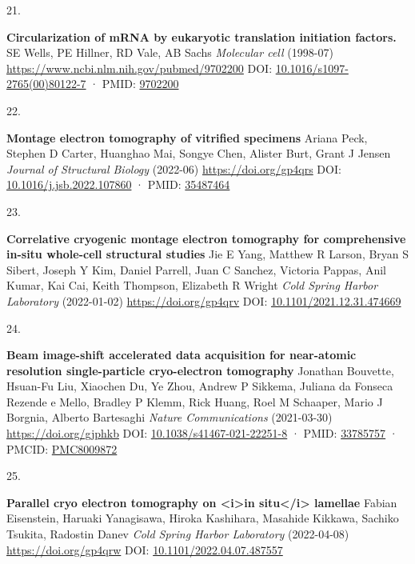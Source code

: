 \documentclass[
]{article}
\newlength{\cslhangindent}
\newlength{\csllabelwidth}
\newlength{\cslentryspacingunit} %
\newenvironment{CSLReferences}[2] %
 {%
  \setlength{\parindent}{0pt}
  \ifodd #1
  \let\oldpar\par
  \def\par{\hangindent=\cslhangindent\oldpar}
  \fi
  \setlength{\parskip}{#2\cslentryspacingunit}
 }%
 {}
\newcommand{\CSLBlock}[1]{#1\hfill\break}
\newcommand{\CSLLeftMargin}[1]{\parbox[t]{\csllabelwidth}{#1}}
\newcommand{\CSLRightInline}[1]{\parbox[t]{\linewidth - \csllabelwidth}{#1}\break}
\begin{document}
\begin{CSLReferences}{0}{0}
\leavevmode{}%
\CSLLeftMargin{21. }%
\CSLRightInline{\textbf{Circularization of mRNA by eukaryotic translation initiation factors.}
\CSLBlock{SE Wells, PE Hillner, RD Vale, AB Sachs} \emph{Molecular cell} (1998-07) \url{https://www.ncbi.nlm.nih.gov/pubmed/9702200}
\CSLBlock{DOI: \href{https://doi.org/10.1016/s1097-2765(00)80122-7}{10.1016/s1097-2765(00)80122-7} · PMID: \href{https://www.ncbi.nlm.nih.gov/pubmed/9702200}{9702200}}}

\leavevmode{}%
\CSLLeftMargin{22. }%
\CSLRightInline{\textbf{Montage electron tomography of vitrified specimens}
\CSLBlock{Ariana Peck, Stephen D Carter, Huanghao Mai, Songye Chen, Alister Burt, Grant J Jensen} \emph{Journal of Structural Biology} (2022-06) \url{https://doi.org/gp4qrs}
\CSLBlock{DOI: \href{https://doi.org/10.1016/j.jsb.2022.107860}{10.1016/j.jsb.2022.107860} · PMID: \href{https://www.ncbi.nlm.nih.gov/pubmed/35487464}{35487464}}}

\leavevmode{}%
\CSLLeftMargin{23. }%
\CSLRightInline{\textbf{Correlative cryogenic montage electron tomography for comprehensive in-situ whole-cell structural studies}
\CSLBlock{Jie E Yang, Matthew R Larson, Bryan S Sibert, Joseph Y Kim, Daniel Parrell, Juan C Sanchez, Victoria Pappas, Anil Kumar, Kai Cai, Keith Thompson, Elizabeth R Wright} \emph{Cold Spring Harbor Laboratory} (2022-01-02) \url{https://doi.org/gp4qrv}
\CSLBlock{DOI: \href{https://doi.org/10.1101/2021.12.31.474669}{10.1101/2021.12.31.474669}}}

\leavevmode{}%
\CSLLeftMargin{24. }%
\CSLRightInline{\textbf{Beam image-shift accelerated data acquisition for near-atomic resolution single-particle cryo-electron tomography}
\CSLBlock{Jonathan Bouvette, Hsuan-Fu Liu, Xiaochen Du, Ye Zhou, Andrew P Sikkema, Juliana da Fonseca Rezende e Mello, Bradley P Klemm, Rick Huang, Roel M Schaaper, Mario J Borgnia, Alberto Bartesaghi} \emph{Nature Communications} (2021-03-30) \url{https://doi.org/gjphkb}
\CSLBlock{DOI: \href{https://doi.org/10.1038/s41467-021-22251-8}{10.1038/s41467-021-22251-8} · PMID: \href{https://www.ncbi.nlm.nih.gov/pubmed/33785757}{33785757} · PMCID: \href{https://www.ncbi.nlm.nih.gov/pmc/articles/PMC8009872}{PMC8009872}}}

\leavevmode{}%
\CSLLeftMargin{25. }%
\CSLRightInline{\textbf{Parallel cryo electron tomography on \textless i\textgreater in situ\textless/i\textgreater{} lamellae}
\CSLBlock{Fabian Eisenstein, Haruaki Yanagisawa, Hiroka Kashihara, Masahide Kikkawa, Sachiko Tsukita, Radostin Danev} \emph{Cold Spring Harbor Laboratory} (2022-04-08) \url{https://doi.org/gp4qrw}
\CSLBlock{DOI: \href{https://doi.org/10.1101/2022.04.07.487557}{10.1101/2022.04.07.487557}}}


\end{CSLReferences}
\end{document}
